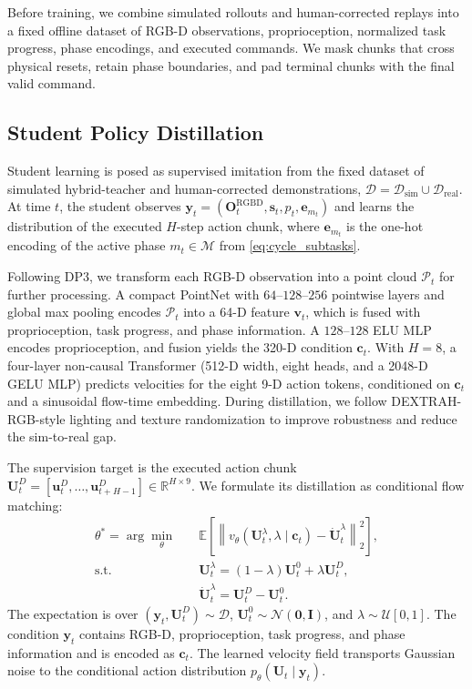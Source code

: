 Before training, we combine simulated rollouts and human-corrected replays into
a fixed offline dataset of RGB-D observations, proprioception, normalized task
progress, phase encodings, and executed commands. We mask chunks that cross
physical resets, retain phase boundaries, and pad terminal chunks with the
final valid command.

\subsection{Student Policy Distillation}
\label{sec:flow_distillation}

Student learning is posed as supervised imitation from the fixed dataset of
simulated hybrid-teacher and human-corrected demonstrations,
$\mathcal D=\mathcal D_{\mathrm{sim}}\cup\mathcal D_{\mathrm{real}}$. At time
$t$, the student observes
$\mathbf{y}_t=(\mathbf{O}^{\mathrm{RGBD}}_t,\mathbf{s}_t,p_t,\mathbf{e}_{m_t})$
and learns the distribution of the executed $H$-step action chunk, where
$\mathbf{e}_{m_t}$ is the one-hot encoding of the active phase
$m_t\in\mathcal M$ from \eqref{eq:cycle_subtasks}.

Following DP3\cite{ze2024dp3}, we transform each RGB-D observation into a
point cloud $\mathcal{P}_t$ for further processing. A compact PointNet with
$64$--$128$--$256$ pointwise layers and global max pooling encodes
$\mathcal{P}_t$ into a 64-D feature $\mathbf{v}_t$, which is fused with
proprioception, task progress, and phase information. A $128$--$128$ ELU MLP
encodes proprioception, and fusion yields the 320-D condition $\mathbf{c}_t$.
With $H=8$, a four-layer non-causal Transformer (512-D width, eight heads, and
a 2048-D GELU MLP) predicts velocities for the eight 9-D action tokens,
conditioned on $\mathbf{c}_t$ and a sinusoidal flow-time embedding.
During distillation, we follow DEXTRAH-RGB\cite{dextrahrgb}-style lighting and
texture randomization to improve robustness and reduce the sim-to-real gap.

The supervision target is the executed action chunk
$\mathbf{U}_t^D=[\mathbf{u}^D_t,\ldots,\mathbf{u}^D_{t+H-1}]
\in\mathbb{R}^{H\times9}$. We formulate its distillation as conditional flow
matching:
\begin{equation}
  \begin{aligned}
  \theta^*=\arg\min_\theta\quad&
  \mathbb E\!\left[
    \left\|v_\theta(\mathbf U_t^\lambda,\lambda\mid\mathbf c_t)
    -\dot{\mathbf U}_t^\lambda\right\|_2^2
  \right],\\
  \text{s.t.}\quad
  &\mathbf U_t^\lambda
    =(1-\lambda)\mathbf U_t^0+\lambda\mathbf U_t^D,\\
  &\dot{\mathbf U}_t^\lambda=\mathbf U_t^D-\mathbf U_t^0.
  \end{aligned}
  \label{eq:flow_objective}
\end{equation}
The expectation is over
$(\mathbf y_t,\mathbf U_t^D)\sim\mathcal D$,
$\mathbf U_t^0\sim\mathcal N(\mathbf0,\mathbf I)$, and
$\lambda\sim\mathcal U[0,1]$. The condition $\mathbf y_t$ contains RGB-D,
proprioception, task progress, and phase information and is encoded as
$\mathbf c_t$. The learned velocity field transports Gaussian noise to the
conditional action distribution $p_\theta(\mathbf U_t\mid\mathbf y_t)$.


